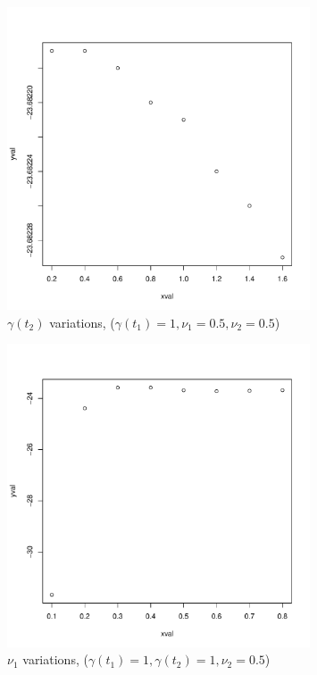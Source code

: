 \documentclass[a4paper,11pt]{article}
\begin{document}
\begin{figure}[H]
\centering
\includegraphics[width=0.8\textwidth]{test2_gamma2.pdf}
\caption{$\gamma(t_2)$ variations, ($\gamma(t_1) = 1, \nu_1 = 0.5, \nu_2 = 0.5$)}
\end{figure}

\begin{figure}[H]
\centering
\includegraphics[width=0.8\textwidth]{test2_nu1.pdf}
\caption{$\nu_1$ variations, ($\gamma(t_1) = 1, \gamma(t_2) = 1, \nu_2 = 0.5$)}
\end{figure}
\end{document}
